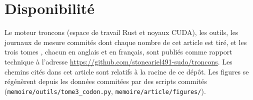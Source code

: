 \documentclass[11pt, a4paper]{article}
\theoremstyle{remark}
\newcommand{\fichier}[1]{\textsf{\footnotesize\nolinkurl{#1}}}
\newcommand{\Emplacement}{\url{https://github.com/stoneariel491-sudo/troncons}}
\begin{document}
\section*{Disponibilité}\label{sec-dispo}

Le moteur troncons (espace de travail Rust et noyaux CUDA), les outils, les journaux de mesure commités dont chaque nombre de cet article est tiré, et les trois tomes \citep{troncons-tome1,troncons-tome2,troncons-tome3}, chacun en anglais et en français, sont publiés comme rapport technique à l'adresse \Emplacement. Les chemins cités dans cet article sont relatifs à la racine de ce dépôt. Les figures se régénèrent depuis les données commitées par des scripts commités (\fichier{memoire/outils/tome3\_codon.py}, \fichier{memoire/article/figures/}).



\end{document}
